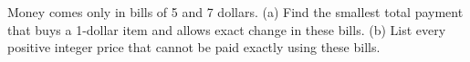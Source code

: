 Money comes only in bills of 5 and 7 dollars. (a) Find the smallest total payment that buys a 1-dollar item and allows exact change in these bills. (b) List every positive integer price that cannot be paid exactly using these bills.
